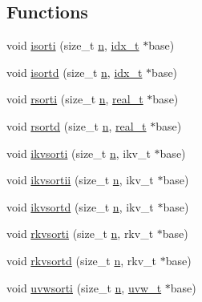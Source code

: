 \subsection*{Functions}
\begin{DoxyCompactItemize}
\item 
void \hyperlink{a00209_afc154279aa00bea9ce5c90b8c6906cc6}{isorti} (size\+\_\+t \hyperlink{a00623_a781a04ab095280f838ff3eb0e51312e0}{n}, \hyperlink{a00876_aaa5262be3e700770163401acb0150f52}{idx\+\_\+t} $\ast$base)
\item 
void \hyperlink{a00209_afe96a5fa1a6a4a60a13fe221567a793c}{isortd} (size\+\_\+t \hyperlink{a00623_a781a04ab095280f838ff3eb0e51312e0}{n}, \hyperlink{a00876_aaa5262be3e700770163401acb0150f52}{idx\+\_\+t} $\ast$base)
\item 
void \hyperlink{a00209_aa5a65b8ee3ec8f704ad120d4381cc79a}{rsorti} (size\+\_\+t \hyperlink{a00623_a781a04ab095280f838ff3eb0e51312e0}{n}, \hyperlink{a00876_a1924a4f6907cc3833213aba1f07fcbe9}{real\+\_\+t} $\ast$base)
\item 
void \hyperlink{a00209_a13855928d837857052613775a9c389b5}{rsortd} (size\+\_\+t \hyperlink{a00623_a781a04ab095280f838ff3eb0e51312e0}{n}, \hyperlink{a00876_a1924a4f6907cc3833213aba1f07fcbe9}{real\+\_\+t} $\ast$base)
\item 
void \hyperlink{a00209_a5789edd7474ebff4ba748d7f061d86fb}{ikvsorti} (size\+\_\+t \hyperlink{a00623_a781a04ab095280f838ff3eb0e51312e0}{n}, ikv\+\_\+t $\ast$base)
\item 
void \hyperlink{a00209_a1cc6186193b50112216341c8f7009826}{ikvsortii} (size\+\_\+t \hyperlink{a00623_a781a04ab095280f838ff3eb0e51312e0}{n}, ikv\+\_\+t $\ast$base)
\item 
void \hyperlink{a00209_ade88b48ed46595efb31adeaff9edd061}{ikvsortd} (size\+\_\+t \hyperlink{a00623_a781a04ab095280f838ff3eb0e51312e0}{n}, ikv\+\_\+t $\ast$base)
\item 
void \hyperlink{a00209_aa153a7b3b6df7eba8a8bd089764acf27}{rkvsorti} (size\+\_\+t \hyperlink{a00623_a781a04ab095280f838ff3eb0e51312e0}{n}, rkv\+\_\+t $\ast$base)
\item 
void \hyperlink{a00209_a6961f443a10dc76ff07a0c3498a808cb}{rkvsortd} (size\+\_\+t \hyperlink{a00623_a781a04ab095280f838ff3eb0e51312e0}{n}, rkv\+\_\+t $\ast$base)
\item 
void \hyperlink{a00209_a26aa6506404f80ed9e0b48249f4d4748}{uvwsorti} (size\+\_\+t \hyperlink{a00623_a781a04ab095280f838ff3eb0e51312e0}{n}, \hyperlink{a00710}{uvw\+\_\+t} $\ast$base)
\end{DoxyCompactItemize}


